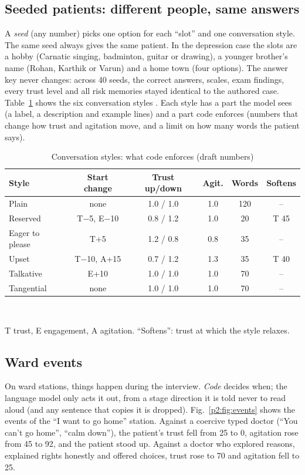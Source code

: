 \documentclass[journal]{IEEEtran}
\begin{document}
\subsection{Seeded patients: different people, same answers}
A \emph{seed} (any number) picks one option for each ``slot'' and one conversation style. The same seed always gives the same patient. In the
depression case the slots are a hobby (Carnatic singing, badminton, guitar or drawing), a younger brother's name (Rohan, Karthik or Varun) and a home
town (four options). The answer key never changes: across 40 seeds, the correct answers, scales, exam findings, every trust level and all risk
memories stayed identical to the authored case. Table~\ref{p2:tab:styles} shows the six conversation styles \cite{wang2024patient}. Each style has a
part the model sees (a label, a description and example lines) and a part code enforces (numbers that change how trust and agitation move, and a
limit on how many words the patient says).

\begin{table}[t]
\caption{Conversation styles: what code enforces (draft numbers)}
\label{p2:tab:styles}
\centering
\scriptsize
\begin{tabular}{@{}lccccc@{}}
\toprule
Style & Start change & Trust up/down & Agit. & Words & Softens\\
\midrule
Plain & none & 1.0 / 1.0 & 1.0 & 120 & --\\
Reserved & T$-$5, E$-$10 & 0.8 / 1.2 & 1.0 & 20 & T 45\\
Eager to please & T+5 & 1.2 / 0.8 & 0.8 & 35 & --\\
Upset & T$-$10, A+15 & 0.7 / 1.2 & 1.3 & 35 & T 40\\
Talkative & E+10 & 1.0 / 1.0 & 1.0 & 70 & --\\
Tangential & none & 1.0 / 1.0 & 1.0 & 70 & --\\
\bottomrule
\end{tabular}
\\[1mm]\raggedright\scriptsize T trust, E engagement, A agitation. ``Softens'': trust at which the style relaxes.
\end{table}

\subsection{Ward events}
On ward stations, things happen during the interview. \emph{Code} decides when; the language model only acts it out, from a stage direction it is
told never to read aloud (and any sentence that copies it is dropped). Fig.~\ref{p2:fig:events} shows the events of the ``I want to go home''
station. Against a coercive typed doctor (``You can't go home'', ``calm down''), the patient's trust fell from 25 to 0, agitation rose from 45 to 92, and the patient stood up. Against a doctor who explored reasons, explained rights honestly and offered choices, trust rose to 70 and agitation fell to 25.
\end{document}
